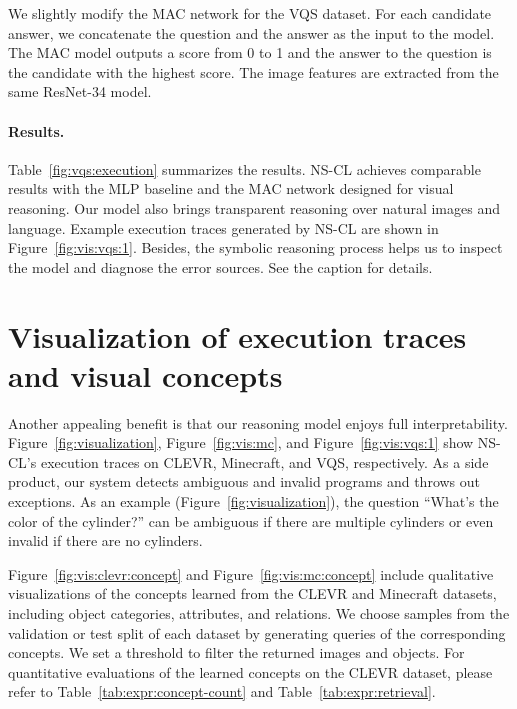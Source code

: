 \documentclass{article} %
\newcommand{\model}{NS-CL\xspace}
\begin{document}
{We slightly modify the MAC network for the VQS dataset. For each candidate answer, we concatenate the question and the answer as the input to the model. The MAC model outputs a score from 0 to 1 and the answer to the question is the candidate with the highest score. The image features are extracted from the same ResNet-34 model.

\paragraph{Results. }
Table~\ref{fig:vqs:execution} summarizes the results. \model achieves comparable results with the MLP baseline and the MAC network designed for visual reasoning. Our model also brings transparent reasoning over natural images and language. Example execution traces generated by \model are shown in Figure~\ref{fig:vis:vqs:1}. Besides, the symbolic reasoning process helps us to inspect the model and diagnose the error sources. See the caption for details. 

\section{Visualization of execution traces and visual concepts}
\label{sec:app:concept}

Another appealing benefit is that our reasoning model enjoys full interpretability. Figure~\ref{fig:visualization}, Figure~\ref{fig:vis:mc}, and Figure~\ref{fig:vis:vqs:1} show \model's execution traces on CLEVR, Minecraft, and VQS, respectively. As a side product, our system detects ambiguous and invalid programs and throws out exceptions. As an example (Figure~\ref{fig:visualization}), the question ``What's the color of the cylinder?'' can be ambiguous if there are multiple cylinders or even invalid if there are no cylinders.

Figure~\ref{fig:vis:clevr:concept} and Figure~\ref{fig:vis:mc:concept} include qualitative visualizations of the concepts learned from the CLEVR and Minecraft datasets, including object categories, attributes, and relations. We choose samples from the validation or test split of each dataset by generating queries of the corresponding concepts. We set a threshold to filter the returned images and objects. For quantitative evaluations of the learned concepts on the CLEVR dataset, please refer to Table~\ref{tab:expr:concept-count} and Table~\ref{tab:expr:retrieval}.

}
\end{document}
